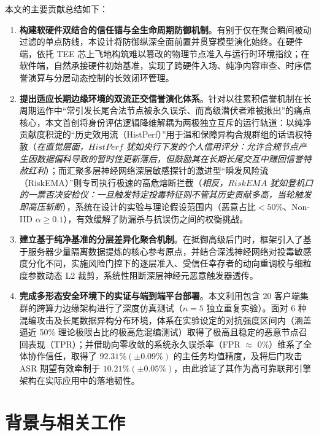 \documentclass[runningheads]{llncs}
\begin{document}
本文的主要贡献总结如下：
\begin{enumerate}
    \item \textbf{构建软硬件双结合的信任锚与全生命周期防御机制}。有别于仅在聚合瞬间被动过滤的单点防线，本设计将防御纵深全面前置并贯穿模型演化始终。在硬件端，依托 TEE 芯上飞地构筑难以篡改的物理节点准入与运行时环境指纹；在软件端，自然承接硬件初始基准，实现了跨硬件入场、纯净内容审查、时序信誉演算与分层动态控制的长效闭环管理。
    \item \textbf{提出适应长期边缘环境的双流正交信誉演化体系}。针对以往累积信誉机制在长周期运作中“常引发长尾合法节点被永久误杀、而高级潜伏者难被揪出”的痛点核心，本文首创将身份评估逻辑降维解耦为两极独立互斥的运行轨道：以纯净贡献度积淀的“历史效用流（HistPerf）”用于温和保障异构合规群组的话语权特赦（\textit{在直觉层面，$HistPerf$ 犹如央行下发的个人信用评分：允许合规节点产生因数据偏科导致的暂时性更新落后，但鼓励其在长期长尾交互中赚回信誉特赦红利}）；而汇聚多层神经网络深层敏感探针的激进型“瞬发风险流（RiskEMA）”则专司执行极速的高危熔断拦截（\textit{相反，$RiskEMA$ 犹如登机口的一票否决安检仪：一旦触发特定投毒特征则不管其历史贡献多高，当轮触发即高压斩断}），系统在设计的实验与理论假设范围内（恶意占比$<50\%$、Non-IID $\alpha \geq 0.1$），有效缓解了防漏杀与抗误伤之间的权衡挑战。
    \item \textbf{建立基于纯净基准的分层差异化聚合机制}。在抵御高级后门时，框架引入了基于服务器少量隔离数据提炼的核心参考原点，并结合深浅神经网络对投毒敏感度分化不同，实施风险门控下的逐层准入、受信任幸存者的动向重调校与细粒度参数动态 L2 裁剪，系统性阻断深层神经元恶意触发器透传。
    \item \textbf{完成多形态安全环境下的实证与端到端平台部署}。本文利用包含 20 客户端集群的跨算力边缘架构进行了深度仿真测试（$n=5$ 独立重复实验）。面对 6 种混编攻击及长尾数据异构分布环境，体系在实验设定的对抗强度区间内（涵盖逼近 50\% 理论极限占比的极高危混编测试）取得了极高且稳定的恶意节点召回表现（TPR）；并借助向零收敛的系统永久误杀率（FPR $\approx$ 0\%）维系了全体协作信任，取得了 $92.31\% (\pm 0.09\%)$ 的主任务均值精度，及将后门攻击 ASR 期望有效牵制于 $10.21\% (\pm 0.05\%)$，由此验证了其作为高可靠联邦引擎架构在实际应用中的落地韧性。
\end{enumerate}


\section{背景与相关工作}
\end{document}
